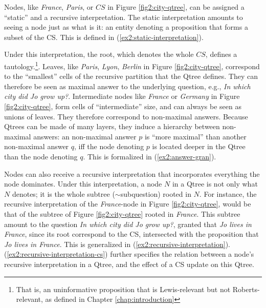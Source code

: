 Nodes, like \textit{France}, \textit{Paris}, or $CS$ in Figure \ref{fig2:city-qtree}, can be assigned a ``static'' and a recursive interpretation. The static interpretation amounts to seeing a node just as what is it: an entity denoting a proposition that forms a subset of the CS. This is defined in (\ref{ex2:static-interpretation}).

\begin{exe}
	\label{ex2:static-interpretation}
\end{exe}

Under this interpretation, the root, which denotes the whole $CS$, defines a tautology.\footnote{That is, an uninformative proposition that is Lewis-relevant but not Roberts-relevant, as defined in Chapter \ref{chap:introduction}}. Leaves, like \textit{Paris}, \textit{Lyon}, \textit{Berlin} in Figure \ref{fig2:city-qtree}, correspond to the ``smallest'' cells of the recursive partition that the Qtree defines. They can therefore be seen as maximal answer to the underlying question, e.g., \textit{In which city did Jo grow up?}. Intermediate nodes like \textit{France} or \textit{Germany} in Figure \ref{fig2:city-qtree}, form cells of ``intermediate'' size, and can always be seen as unions of leaves. They therefore correspond to non-maximal answers. Because Qtrees can be made of many layers, they induce a hierarchy between non-maximal answers: an non-maximal answer $p$ is ``more maximal'' than another non-maximal answer $q$, iff the node denoting $p$ is located deeper in the Qtree than the node denoting $q$. This is formalized in (\ref{ex2:answer-gran}).

\begin{exe}
	\label{ex2:answer-gran}
\end{exe}

Nodes can also receive a recursive interpretation that incorporates everything the node dominates. Under this interpretation, a node $N$ in a Qtree is not only what $N$ denotes; it is the whole subtree ($\sim$subquestion) rooted in $N$. For instance, the recursive interpretation of the \textit{France}-node in Figure \ref{fig2:city-qtree}, would be that of the subtree of Figure \ref{fig2:city-qtree} rooted in \textit{France}. This subtree amount to the question \textit{In which city did Jo grow up?}, granted that \textit{Jo lives in France}, since its root correspond to the CS, intersected with the proposition that \textit{Jo lives in France}. This is generalized in (\ref{ex2:recursive-interpretation}). (\ref{ex2:recursive-interpretation-cs}) further specifies the relation between a node's recursive interpretation in a Qtree, and the effect of a CS update on this Qtree.

